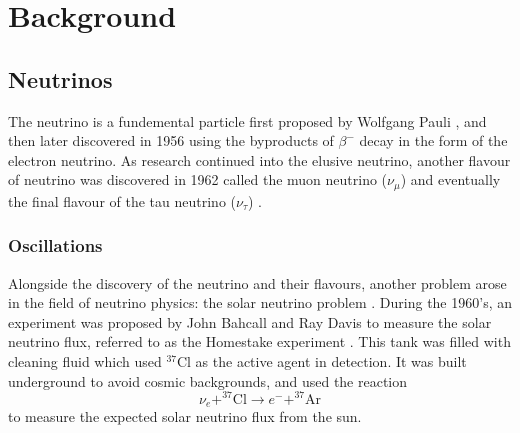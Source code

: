 \chapter{Background}\label{ch:Background}

\section{Neutrinos}

The neutrino is a fundemental particle first proposed by Wolfgang Pauli \cite{nu_proposition}, and then later discovered in 1956 using the byproducts of $\beta^{-}$ decay \cite{aneut} in the form of the electron neutrino. As research continued into the elusive neutrino, another flavour of neutrino was discovered in 1962 called the muon neutrino ($\nu_{\mu}$) \cite{m_nu} and eventually the final flavour of the tau neutrino ($\nu_\tau$) \cite{t_nu}. 

\subsection{Oscillations}\label{subsec:osc}

Alongside the discovery of the neutrino and their flavours, another problem arose in the field of neutrino physics: the solar neutrino problem \cite{lowe_nu}. During the 1960's, an experiment was proposed by John Bahcall and Ray Davis to measure the solar neutrino flux, referred to as the Homestake experiment \cite{davis, bahcall}. This tank was filled with cleaning fluid which used $^{37}$Cl as the active agent in detection. It was built underground to avoid cosmic backgrounds, and used the reaction\cite{davis, bahcall}
\begin{equation}\label{eq:cl}
  \nu_{e} + ^{37}\text{Cl} \to e^{-} + ^{37}\text{Ar}
\end{equation}
to measure the expected solar neutrino flux from the sun. 

